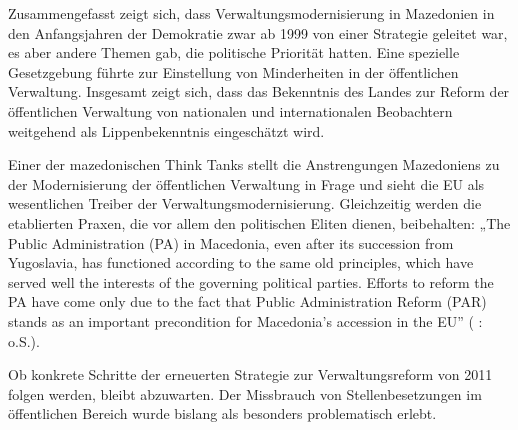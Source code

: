 Zusammengefasst zeigt sich, dass Verwaltungsmodernisierung in Mazedonien in den Anfangsjahren der Demokratie zwar ab 1999 von einer Strategie geleitet war, es aber andere Themen gab, die politische Priorität hatten. Eine spezielle Gesetzgebung führte zur Einstellung von Minderheiten in der öffentlichen Verwaltung. Insgesamt zeigt sich, dass das Bekenntnis des Landes zur Reform der öffentlichen Verwaltung von nationalen und internationalen Beobachtern weitgehend als Lippenbekenntnis eingeschätzt wird.\par
Einer der mazedonischen Think Tanks stellt die Anstrengungen Mazedoniens zu der Modernisierung der öffentlichen Verwaltung in Frage und sieht die EU als wesentlichen Treiber der Verwaltungsmodernisierung. Gleichzeitig werden die etablierten Praxen, die vor allem den politischen Eliten dienen, beibehalten: „The Public Administration (PA) in Macedonia, even after its succession from Yugoslavia, has functioned according to the same old principles, which have served well the interests of the governing political parties. Efforts to reform the PA have come only due to the fact that Public Administration Reform (PAR) stands as an important precondition for Macedonia’s accession in the EU” (\cite{analyt11} :  o.S.).\par
Ob konkrete Schritte der erneuerten Strategie zur Verwaltungsreform von 2011 folgen werden, bleibt abzuwarten. Der Missbrauch von Stellenbesetzungen im öffentlichen Bereich wurde bislang als besonders problematisch erlebt. 

